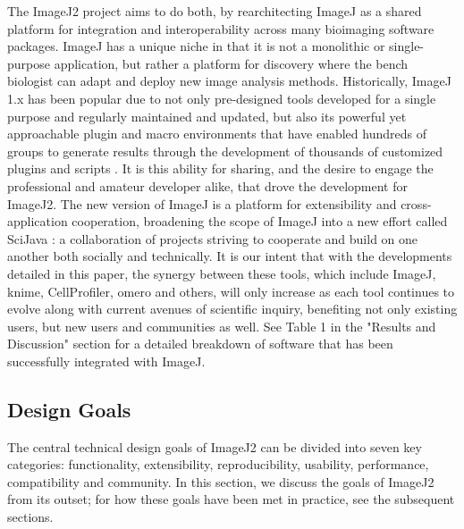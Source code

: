 \documentclass{bmcart}
\begin{document}
The ImageJ2 project aims to do both, by rearchitecting ImageJ as a shared
platform for integration and interoperability across many bioimaging software
packages. ImageJ has a unique niche in that it is not a monolithic or
single-purpose application, but rather a platform for discovery
where the bench biologist can adapt and deploy new image analysis methods.
Historically, ImageJ 1.x has been popular due to not only pre-designed tools
developed for a single purpose and regularly maintained and updated, but also
its powerful yet approachable plugin and macro environments that have enabled
hundreds of groups to generate results through the development of thousands of
customized plugins and scripts \cite{imagej_review, imagej_ecosystem,
imagej_list_of_update_sites}. It is this ability for sharing, and the desire to
engage the professional and amateur developer alike, that drove the development
for ImageJ2. The new version of ImageJ is a platform for extensibility and
cross-application cooperation, broadening the scope of ImageJ into a new effort
called SciJava \cite{scijava}: a collaboration of projects striving to
cooperate and build on one another both socially and technically. It is our
intent that with the developments detailed in this paper, the synergy between
these tools, which include ImageJ, \acrshort{knime}, CellProfiler,
\acrshort{omero} and others, will only increase as each tool continues to
evolve along with current avenues of scientific inquiry, benefiting not only existing users, but new users and communities as
well. See Table 1 in the "Results and Discussion" section for a detailed
breakdown of software that has been successfully integrated with ImageJ.


\subsection*{Design Goals}
The central technical design goals of ImageJ2 can be divided into seven key
categories: functionality, extensibility, reproducibility, usability,
performance, compatibility and community. In this section, we discuss the goals
of ImageJ2 from its outset; for how these goals have been met in practice, see
the subsequent sections.
\end{document}
